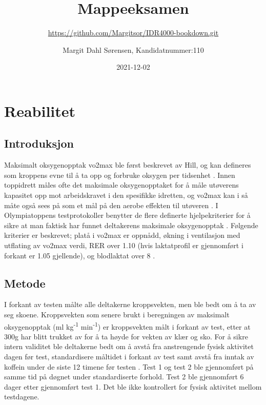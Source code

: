\documentclass[
]{book}
\title{Mappeeksamen}
\subtitle{\url{https://github.com/Margitsor/IDR4000-bookdown.git}}
\author{Margit Dahl Sørensen, Kandidatnummer:110}
\date{2021-12-02}
\begin{document}
\maketitle

{
\setcounter{tocdepth}{1}
\tableofcontents
}
\hypertarget{reabilitet}{%
\chapter{Reabilitet}\label{reabilitet}}

\hypertarget{introduksjon}{%
\section{Introduksjon}\label{introduksjon}}

Maksimalt oksygenopptak vo2max ble først beskrevet av Hill, og kan defineres som kroppens evne til å ta opp og forbruke oksygen per tidsenhet \citep{hill1923}. Innen toppidrett måles ofte det maksimale oksygenopptaket for å måle utøverens kapasitet opp mot arbeidskravet i den spesifikke idretten, og vo2max kan i så måte også sees på som et mål på den aerobe effekten til utøveren \citep{bassett2000}. I Olympiatoppens testprotokoller benytter de flere definerte hjelpekriterier for å sikre at man faktisk har funnet deltakerens maksimale oksygenopptak \citep{tønnessen2017}. Følgende kriterier er beskrevet; platå i vo2max er oppnådd, økning i ventilasjon med utflating av vo2max verdi, RER over 1.10 (hvis laktatprofil er gjennomført i forkant er 1.05 gjellende), og blodlaktat over 8 \citep{tønnessen2017}.

\hypertarget{metode}{%
\section{Metode}\label{metode}}

I forkant av testen målte alle deltakerne kroppsvekten, men ble bedt om å ta av seg skoene. Kroppsvekten som senere brukt i beregningen av maksimalt oksygenopptak (ml kg\textsuperscript{-1} min\textsuperscript{-1}) er kroppsvekten målt i forkant av test, etter at 300g har blitt trukket av for å ta høyde for vekten av klær og sko. For å sikre intern validitet ble deltakerne bedt om å avstå fra anstrengende fysisk aktivitet dagen før test, standardisere måltidet i forkant av test samt avstå fra inntak av koffein under de siste 12 timene før testen \citep{halperin2015}. Test 1 og test 2 ble gjennomført på samme tid på døgnet under standardiserte forhold. Test 2 ble gjennomført 6 dager etter gjennomført test 1. Det ble ikke kontrollert for fysisk aktivitet mellom testdagene.
\end{document}
